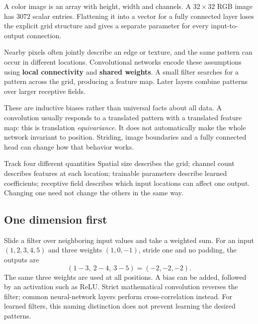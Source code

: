 \documentclass[11pt]{article}
\begin{document}
\tableofcontents\clearpage
{}
A color image is an array with height, width and channels. A $32\times32$ RGB image has $3072$ scalar entries. Flattening it into a vector for a fully connected layer loses the explicit grid structure and gives a separate parameter for every input-to-output connection.

Nearby pixels often jointly describe an edge or texture, and the same pattern can occur in different locations. Convolutional networks encode these assumptions using \textbf{local connectivity} and \textbf{shared weights}. A small filter searches for a pattern across the grid, producing a feature map. Later layers combine patterns over larger receptive fields.

These are inductive biases rather than universal facts about all data. A convolution usually responds to a translated pattern with a translated feature map: this is translation \emph{equivariance}. It does not automatically make the whole network invariant to position. Striding, image boundaries and a fully connected head can change how that behavior works.
\begin{keyidea}{Track four different quantities}
Spatial size describes the grid; channel count describes features at each location; trainable parameters describe learned coefficients; receptive field describes which input locations can affect one output. Changing one need not change the others in the same way.
\end{keyidea}
\subsection{One dimension first}
Slide a filter over neighboring input values and take a weighted sum. For an input $(1,2,3,4,5)$ and three weights $(1,0,-1)$, stride one and no padding, the outputs are
\[
(1-3,\ 2-4,\ 3-5)=(-2,-2,-2).
\]
The same three weights are used at all positions. A bias can be added, followed by an activation such as ReLU. Strict mathematical convolution reverses the filter; common neural-network layers perform cross-correlation instead. For learned filters, this naming distinction does not prevent learning the desired patterns.
\end{document}
